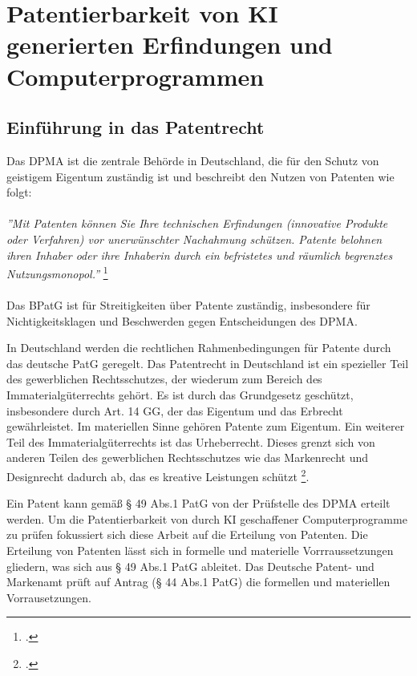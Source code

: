 \chapter{Patentierbarkeit von KI generierten Erfindungen und Computerprogrammen \label{cha:chapter3}}


\section{Einführung in das Patentrecht\label{sec:Patentrecht}}


Das \gls{DPMA} ist die zentrale Behörde in Deutschland, 
die für den Schutz von geistigem Eigentum zuständig ist und 
beschreibt den Nutzen von Patenten wie folgt:
\\
\\
\textit{''Mit Patenten können Sie Ihre technischen Erfindungen 
(innovative Produkte oder Verfahren) vor unerwünschter Nachahmung schützen. 
Patente belohnen ihren Inhaber 
oder ihre Inhaberin durch ein befristetes und räumlich begrenztes Nutzungsmonopol.''} 
\footcite{DPMAPatentschutz}
\\
\\
Das \gls{BPatG} ist für Streitigkeiten über Patente zuständig, 
insbesondere für Nichtigkeitsklagen und Beschwerden gegen Entscheidungen des DPMA.

In Deutschland werden die rechtlichen Rahmenbedingungen für Patente durch das deutsche PatG
geregelt.
Das Patentrecht in Deutschland ist ein spezieller Teil des gewerblichen Rechtsschutzes, 
der wiederum zum Bereich des Immaterialgüterrechts gehört. 
Es ist durch das Grundgesetz geschützt, insbesondere durch Art. 14 GG, 
der das Eigentum und das Erbrecht gewährleistet. 
Im materiellen Sinne gehören Patente zum Eigentum.
Ein weiterer Teil des Immaterialgüterrechts ist das Urheberrecht. 
Dieses grenzt sich von anderen Teilen des
gewerblichen Rechtsschutzes wie das Markenrecht und Designrecht dadurch ab, das 
es kreative Leistungen schützt \footcite{GewerblicherRechtschutzUnd}. 

Ein Patent kann gemäß § 49 Abs.1 PatG von der Prüfstelle des DPMA erteilt werden. 
Um die Patentierbarkeit von durch KI geschaffener Computerprogramme 
zu prüfen fokussiert sich diese Arbeit auf die Erteilung von Patenten. 
Die Erteilung von Patenten lässt sich in formelle und materielle Vorrraussetzungen 
gliedern, was sich aus § 49 Abs.1 PatG ableitet. 
Das Deutsche Patent- und Markenamt prüft auf Antrag (§ 44 Abs.1 PatG) 
die formellen und materiellen Vorrausetzungen.

